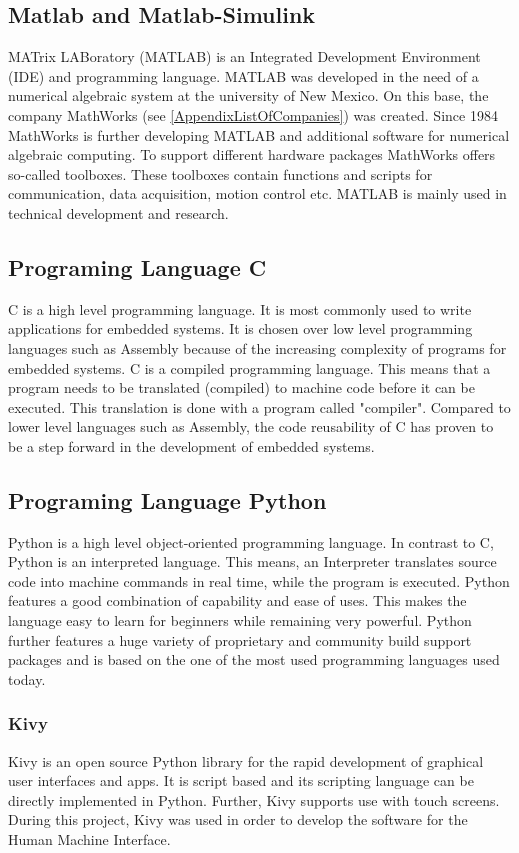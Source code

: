 \subsection{Matlab and Matlab-Simulink}
MATrix LABoratory (MATLAB) is an Integrated Development Environment (IDE)
and programming language. MATLAB was developed in the need of a numerical algebraic
system at the university of New Mexico. On this base, the company MathWorks (see
\ref{AppendixListOfCompanies}) was created. Since 1984 MathWorks is further developing MATLAB and
additional software for numerical algebraic computing. To support different hardware
packages MathWorks offers so-called toolboxes. These toolboxes contain functions and
scripts for communication, data acquisition, motion control etc.
MATLAB is mainly used in technical development and research.\cite{Mathworks}
 
\subsection{Programing Language C}
C is a high level programming language. It is most commonly used to write applications for embedded systems. It is chosen over low level programming languages
such as Assembly because of the increasing complexity of programs for embedded systems. C is a compiled programming language. This means that a program needs to be translated (compiled) to machine code before it can be executed.
This translation is done with a program called "compiler". Compared to lower level languages such as Assembly, the code reusability of C has proven to be a step forward in the development of embedded systems.\cite{ISO2022}
 
 
\subsection{Programing Language Python}
Python is a high level object-oriented programming language. In contrast to C, Python is an interpreted language. This means, an Interpreter translates source code into machine commands in
real time, while the program is executed. Python features a good combination of capability and ease of uses. This makes the language easy to learn for beginners while remaining very powerful.
Python further features a huge variety of proprietary and community build support packages and is based on the one of the most used programming languages used today.\cite{PythonFoundation2022}
 
\subsubsection{Kivy}
Kivy is an open source Python library for the rapid development of graphical user interfaces and apps. It is script based and its scripting language can be directly implemented in Python. Further, Kivy supports use with touch screens. During this project, Kivy was used in order to develop the software for the Human Machine Interface.\cite{Kivy.org2022}
 
